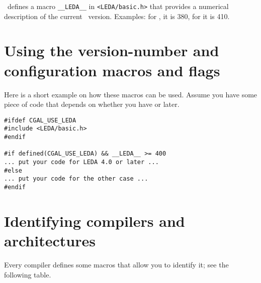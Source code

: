 \noindent \leda\ defines a macro \texttt{\_\_LEDA\_\_}
in
\texttt{<LEDA/basic.h>} that provides a numerical description of the
current \leda\ version. Examples: for , it is 380, for
 it is 410.

\section{Using the version-number and configuration macros and flags}
\label{sec:using_version_macros}

Here is a short example on how these macros can be used. Assume you have some
piece of code that depends on whether you have  or later.
\begin{verbatim}
#ifdef CGAL_USE_LEDA
#include <LEDA/basic.h>
#endif

#if defined(CGAL_USE_LEDA) && __LEDA__ >= 400
... put your code for LEDA 4.0 or later ...
#else
... put your code for the other case ...
#endif 
\end{verbatim}

\section{Identifying compilers and architectures}
\label{sec:which_compiler}

Every compiler defines some macros that allow you to identify it; see 
the following table.

